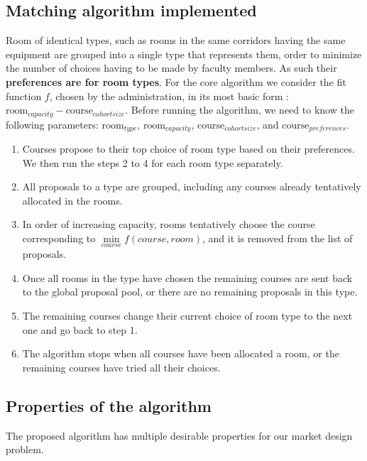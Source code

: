 \documentclass[a4paper, oneside]{article}
\theoremstyle{plain}
\begin{document}
\subsection{Matching algorithm implemented}
Room of identical types, such as rooms in the same corridors having the same equipment are grouped into a single type that represents them, order to  minimize the number of choices having
to be made by faculty members. As such their \textbf{preferences are for room types}. For the core algorithm we consider the fit function $f$, chosen by the administration, in its most basic form :  $\text{room}_{capacity}- \text{course}_{cohort size}$. 
Before running the algorithm, we need to know the following parameters: 
$\text{room}_{type}$, $\text{room}_{capacity}$, $\text{course}_{cohort size}$, and $\text{course}_{preferences}$.
\begin{enumerate}
	\item Courses propose to their top choice of room type based on their preferences. We then run the steps 2 to 4 for each room type separately.
	\item All proposals to a type are grouped, including any courses already tentatively allocated in the rooms.
	\item In order of increasing capacity, rooms tentatively choose the course corresponding to $\underset{course}{\min} f(course, room)$,
	      and it is removed from the list of proposals.
	\item Once all rooms in the type have chosen the remaining courses are sent back to the global proposal pool, or there are no remaining proposals in this type.
	\item The remaining courses change their current choice of room type to the next one and go back to step 1.
	\item The algorithm stops when all courses have been allocated a room, or the remaining courses have tried all their choices.
\end{enumerate}

\subsection{Properties of the algorithm}
The proposed algorithm has multiple desirable properties for our market design problem.
\end{document}
